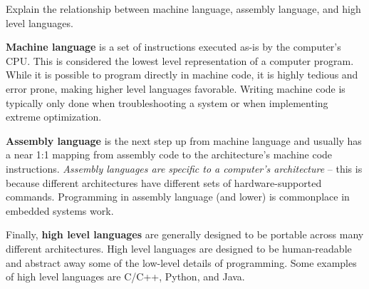 Explain the relationship between machine language, assembly language, and high level languages.\\
\begin{answer}
\small{\textbf{Machine language} is a set of instructions executed as-is by the computer's CPU. This is considered the lowest level representation of a computer program. While it is possible to program directly in machine code, it is highly tedious and error prone, making higher level languages favorable. Writing machine code is typically only done when troubleshooting a system or when implementing extreme optimization.

\textbf{Assembly language} is the next step up from machine language and usually has a near 1:1 mapping from assembly code to the architecture's machine code instructions. \textit{Assembly languages are specific to a computer's architecture} -- this is because different architectures have different sets of hardware-supported commands. Programming in assembly language (and lower) is commonplace in embedded systems work.


Finally, \textbf{high level languages} are generally designed to be portable across many different architectures. 
High level languages are designed to be human-readable and abstract away some of the low-level details of programming. Some examples of high level languages are C/C++, Python, and Java.}
\end{answer}
